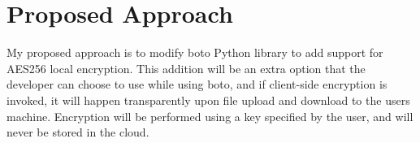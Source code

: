 \section{Proposed Approach}

My proposed approach is to modify boto Python library to add support for AES256 local encryption. 
This addition will be an extra option that the developer can choose to use while using boto, and if client-side encryption
is invoked, it will happen transparently upon file upload and download to the users machine. Encryption will be performed
using a key specified by the user, and will never be stored in the cloud.
